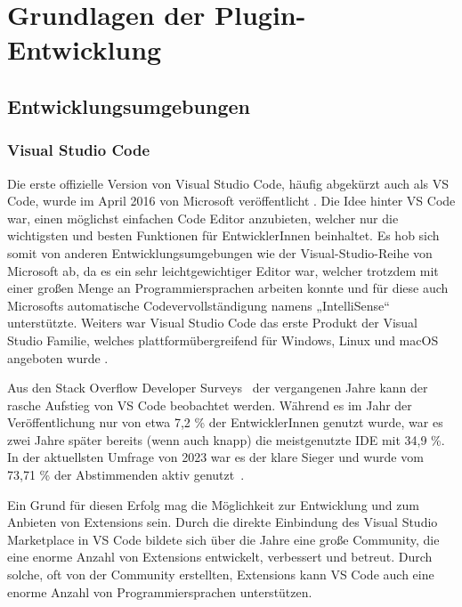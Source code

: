 \chapter{Grundlagen der Plugin-Entwicklung}
\label{cha:Grundlagen}

\section{Entwicklungsumgebungen}
\label{sec:Entwicklungsumgebungen}

\subsection{Visual Studio Code}

Die erste offizielle Version von Visual Studio Code, häufig 
abgekürzt auch als VS Code, wurde im April 2016 
von Microsoft veröffentlicht \cite{VSCodeReleaseDate}. 
Die Idee hinter VS Code
war, einen möglichst einfachen Code Editor anzubieten, 
welcher nur die wichtigsten und besten Funktionen für EntwicklerInnen 
beinhaltet. Es hob sich somit von anderen Entwicklungsumgebungen
wie der Visual-Studio-Reihe von Microsoft ab, da es ein sehr 
leichtgewichtiger Editor war, welcher trotzdem mit einer großen 
Menge an Programmiersprachen arbeiten konnte und für diese auch 
Microsofts automatische Codevervollständigung namens „IntelliSense“ 
unterstützte. Weiters war Visual Studio Code das erste Produkt der Visual 
Studio Familie, welches plattformübergreifend für Windows, Linux und macOS 
angeboten wurde \cite{VSCodePreview}.

Aus den Stack Overflow Developer Surveys~\cite{StackOverflowSurvey,StackOverflowSurvey2023}
der vergangenen Jahre kann 
der rasche Aufstieg von VS Code beobachtet werden. Während es im 
Jahr der Veröffentlichung nur von etwa 7,2 \% der EntwicklerInnen 
genutzt wurde, war es zwei Jahre später bereits (wenn auch knapp) 
die meistgenutzte IDE mit 34,9 \%. In der aktuellsten Umfrage von 
2023 war es der klare Sieger und wurde vom 73,71 \% der Abstimmenden 
aktiv genutzt~\cite{StackOverflowSurvey,StackOverflowSurvey2023}.

Ein Grund für diesen Erfolg mag die Möglichkeit 
zur Entwicklung und zum Anbieten von Extensions sein. Durch die direkte 
Einbindung des Visual Studio Marketplace in VS Code bildete sich über die 
Jahre eine große Community, die eine enorme Anzahl von Extensions 
entwickelt, verbessert und betreut. Durch solche, oft 
von der Community erstellten, Extensions kann VS Code auch eine 
enorme Anzahl von Programmiersprachen unterstützen.


